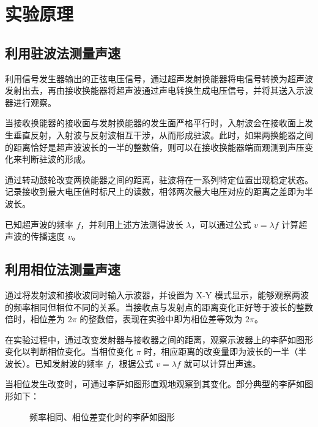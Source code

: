 \documentclass[UTF-8,twoside,cs4size]{ctexart}
\begin{document}
\section{实验原理}
\subsection{利用驻波法测量声速}

利用信号发生器输出的正弦电压信号，通过超声发射换能器将电信号转换为超声波发射出去，再由接收换能器将超声波通过声电转换生成电压信号，并将其送入示波器进行观察。

当接收换能器的接收面与发射换能器的发生面严格平行时，入射波会在接收面上发生垂直反射，入射波与反射波相互干涉，从而形成驻波。此时，如果两换能器之间的距离恰好是超声波波长的一半的整数倍，则可以在接收换能器端面观测到声压变化来判断驻波的形成。

通过转动鼓轮改变两换能器之间的距离，驻波将在一系列特定位置出现稳定状态。记录接收到最大电压值时标尺上的读数，相邻两次最大电压对应的距离之差即为半波长。

已知超声波的频率 $f$，并利用上述方法测得波长 $\lambda$，可以通过公式 $v = \lambda f$ 计算超声波的传播速度 $v$。

\subsection{利用相位法测量声速}

通过将发射波和接收波同时输入示波器，并设置为 X-Y 模式显示，能够观察两波的频率相同但相位不同的关系。当接收点与发射点的距离变化正好等于波长的整数倍时，相位差为 $2\pi$ 的整数倍，表现在实验中即为相位差等效为 $2\pi$。

在实验过程中，通过改变发射器与接收器之间的距离，观察示波器上的李萨如图形变化以判断相位变化。当相位变化 $\pi$ 时，相应距离的改变量即为波长的一半（半波长）。已知发射波的频率 $f$，根据公式 $v = \lambda f$ 就可以计算出声速。

当相位发生改变时，可通过李萨如图形直观地观察到其变化。部分典型的李萨如图形如下：
\begin{figure}[!h]
    \centering
    \caption{频率相同、相位差变化时的李萨如图形}
\end{figure}
\end{document}
